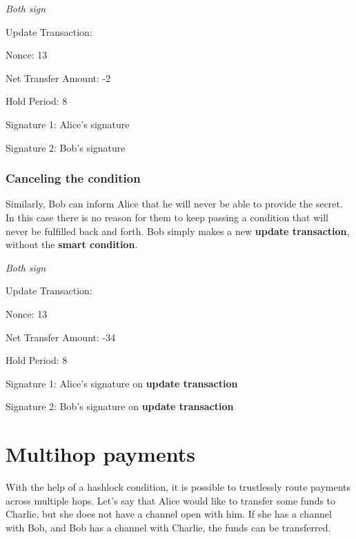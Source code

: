 \documentclass[a4paper]{article}
\newcommand{\bgls}[1]{\textbf{\gls{#1}}}
\newenvironment{mydescription}
{\begin{description}
  \setlength{\itemsep}{5pt}
    \setlength{\parskip}{0pt}
    \setlength{\labelsep}{5pt}
}{
\end{description}}
\begin{document}
\begin{mdframed}[style=message]{\emph{Both sign}}
\begin{mydescription}
  \item[Update Transaction:] \hfill
  \begin{mydescription}
    \item[Nonce:] 13
    \item[Net Transfer Amount:] -2
    \item[Hold Period:] 8
  \end{mydescription}
  \item[Signature 1:] Alice's signature
  \item[Signature 2:] Bob's signature
\end{mydescription}
\end{mdframed}

\subsubsection{Canceling the condition}

Similarly, Bob can inform Alice that he will never be able to provide the secret. In this case there is no reason for them to keep passing a condition that will never be fulfilled back and forth. Bob simply makes a new \bgls{update transaction}, without the \bgls{smart condition}.

\begin{mdframed}[style=message]{\emph{Both sign}}
\begin{mydescription}
  \item[Update Transaction:] \hfill
  \begin{mydescription}
    \item[Nonce:] 13
    \item[Net Transfer Amount:] -34
    \item[Hold Period:] 8
  \end{mydescription}
  \item[Signature 1:] Alice's signature on \bgls{update transaction}
  \item[Signature 2:] Bob's signature on \bgls{update transaction}
\end{mydescription}
\end{mdframed}

\section{Multihop payments}

With the help of a hashlock condition, it is possible to trustlessly route payments across multiple hops. Let's say that Alice would like to transfer some funds to Charlie, but she does not have a channel open with him. If she has a channel with Bob, and Bob has a channel with Charlie, the funds can be transferred.
\end{document}
